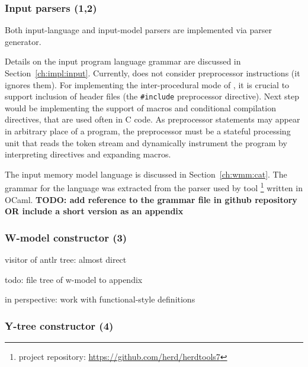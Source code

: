 \subsubsection{Input parsers (1,2)}
\label{ch:impl:proc:input-parser}

Both input-language and input-model parsers are implemented via  parser generator.

Details on the input program language grammar are discussed in Section~\ref{ch:impl:input}.
Currently, \porthos[2] does not consider preprocessor instructions (it ignores them).
For implementing the inter-procedural mode of \porthos{}, it is crucial to support inclusion of header files (the \texttt{\#include} preprocessor directive).
Next step would be implementing the support of macros and conditional compilation directives, that are used often in C code.
As preprocessor statements may appear in arbitrary place of a program, the preprocessor must be a stateful processing unit that reads the token stream and dynamically instrument the program by interpreting directives and expanding macros.

The input memory model language \cat{} is discussed in Section~\ref{ch:wmm:cat}.
The  grammar for the \cat{} language was extracted from the parser used by  tool%
\footnote{ project repository: \url{https://github.com/herd/herdtools7}} %
written in OCaml.
\textbf{TODO: add reference to the grammar file in github repository OR include a short version as an appendix}



\subsubsection{W-model constructor (3)}
\label{ch:impl:proc:w-constr}


visitor of antlr tree: almost direct

todo: file tree of w-model to appendix

in perspective: work with functional-style definitions


\subsubsection{Y-tree constructor (4)}
\label{ch:impl:proc:y-constr}

